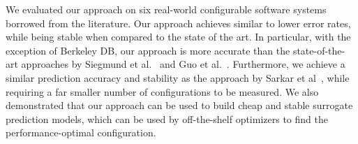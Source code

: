 \documentclass{newsig}
\newcommand{\tion}[1]{\S\ref{sect:#1}}
\begin{document}
We evaluated our approach on six real-world configurable software systems borrowed from the literature. Our approach achieves similar to lower error rates, while being stable when compared to the state of the art. In particular, with the exception of Berkeley DB, our approach is more accurate than the state-of-the-art approaches by Siegmund et al.~\cite{siegmund2012predicting} and Guo et al.~\cite{guo2013variability}. Furthermore, we achieve a similar prediction accuracy and stability as the approach by Sarkar et al~\cite{sarkar2015cost}, while requiring a far smaller number of configurations to be measured. We also demonstrated that our approach can be used to build cheap and stable surrogate prediction models, which can be used by off-the-shelf optimizers to find the performance-optimal configuration. 




 


\balance
  
\end{document}
